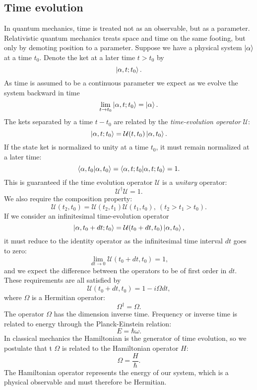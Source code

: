 \subsection{Time evolution}
In quantum mechanics, time is treated not as an observable,
but as a parameter. Relativistic quantum mechanics
treats space and time on the same footing, but only by demoting
position to a parameter.
\newline
Suppose we have a physical system $\ket{\alpha}$
at a time $t_0$. Denote the ket at a later time $t > t_0$ by
$$ \ket{\alpha, t; t_0} .$$
As time is assumed to be a continuous parameter we expect
as we evolve the system backward in time
$$ \lim_{t \rightarrow t_0} \ket{\alpha, t; t_0}
= \ket{\alpha} .$$
The kets separated by a time $t - t_0$
are related by the \textit{time-evolution operator} $\mathcal{U}$:
$$ \ket{\alpha, t; t_0} = \mathcal{U}(t, t_0) \ket{\alpha, t_0} .$$
If the state ket is normalized to unity at a time $t_0$,
it must remain normalized at a later time:
$$ \braket{\alpha, t_0 | \alpha, t_0} = \braket{\alpha, t; t_0
    | \alpha, t; t_0} = 1 .$$
This is guaranteed if the time evolution operator
$\mathcal{U}$ is a \textit{unitary} operator:
$$ \mathcal{U}^{\dagger} \mathcal{U} = 1 .$$
We also require the composition property:
$$ \mathcal{U}(t_2, t_0) = \mathcal{U}(t_2, t_1)
    \mathcal{U}(t_1, t_0), ~ (t_2 > t_1 > t_0) .$$
\newline
If we consider an infinitesimal time-evolution operator
$$ \ket{\alpha, t_0 + dt; t_0} = \mathcal{U}(t_0 + dt, t_0)
\ket{\alpha, t_0} ,$$
it must reduce to the identity operator as the infinitesimal
time interval $dt$ goes to zero:
$$ \lim_{dt \rightarrow 0} \mathcal{U}(t_0 + dt, t_0) = 1, $$
and we expect the difference between the operators
to be of first order in $dt$.
\newline
These requirements are all satisfied by
$$ \mathcal{U}(t_0 + dt, t_0) = 1 - i\Omega dt ,$$
where $\Omega$ is a Hermitian operator:
$$ \Omega^{\dagger} = \Omega .$$
The operator $\Omega$ has the dimension inverse time.
Frequency or inverse time is related to energy
through the Planck-Einstein relation:
$$ E = \hbar \omega .$$
In classical mechanics the Hamiltonian is the generator of time evolution,
so we postulate that t $\Omega$ is related to the Hamiltonian operator
$H$:
$$ \Omega = \frac{H}{\hbar} .$$
The Hamiltonian operator represents the energy of our system,
which is a physical observable and must therefore be Hermitian.

